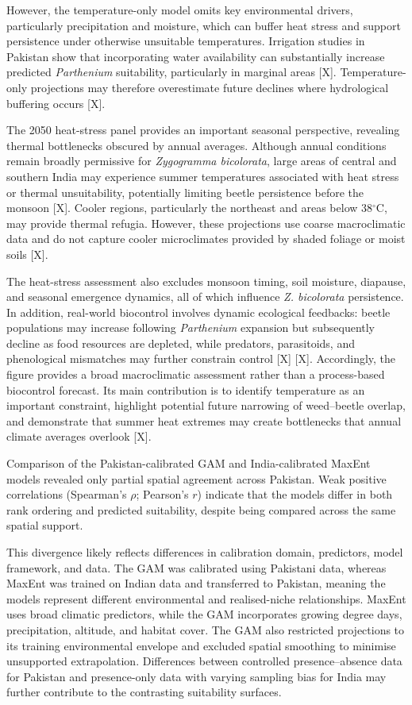 However, the temperature-only model omits key environmental drivers, particularly precipitation and moisture, which can buffer heat stress and support persistence under otherwise unsuitable temperatures. Irrigation studies in Pakistan show that incorporating water availability can substantially increase predicted \textit{Parthenium} suitability, particularly in marginal areas [X]. Temperature-only projections may therefore overestimate future declines where hydrological buffering occurs [X].

The 2050 heat-stress panel provides an important seasonal perspective, revealing thermal bottlenecks obscured by annual averages. Although annual conditions remain broadly permissive for \textit{Zygogramma bicolorata}, large areas of central and southern India may experience summer temperatures associated with heat stress or thermal unsuitability, potentially limiting beetle persistence before the monsoon [X]. Cooler regions, particularly the northeast and areas below 38$^{\circ}$C, may provide thermal refugia. However, these projections use coarse macroclimatic data and do not capture cooler microclimates provided by shaded foliage or moist soils [X].

The heat-stress assessment also excludes monsoon timing, soil moisture, diapause, and seasonal emergence dynamics, all of which influence \textit{Z. bicolorata} persistence. In addition, real-world biocontrol involves dynamic ecological feedbacks: beetle populations may increase following \textit{Parthenium} expansion but subsequently decline as food resources are depleted, while predators, parasitoids, and phenological mismatches may further constrain control [X] [X]. Accordingly, the figure provides a broad macroclimatic assessment rather than a process-based biocontrol forecast. Its main contribution is to identify temperature as an important constraint, highlight potential future narrowing of weed--beetle overlap, and demonstrate that summer heat extremes may create bottlenecks that annual climate averages overlook [X].

Comparison of the Pakistan-calibrated GAM and India-calibrated MaxEnt models revealed only partial spatial agreement across Pakistan. Weak positive correlations (Spearman's $\rho$; Pearson's $r$) indicate that the models differ in both rank ordering and predicted suitability, despite being compared across the same spatial support.

This divergence likely reflects differences in calibration domain, predictors, model framework, and data. The GAM was calibrated using Pakistani data, whereas MaxEnt was trained on Indian data and transferred to Pakistan, meaning the models represent different environmental and realised-niche relationships. MaxEnt uses broad climatic predictors, while the GAM incorporates growing degree days, precipitation, altitude, and habitat cover. The GAM also restricted projections to its training environmental envelope and excluded spatial smoothing to minimise unsupported extrapolation. Differences between controlled presence--absence data for Pakistan and presence-only data with varying sampling bias for India may further contribute to the contrasting suitability surfaces.


